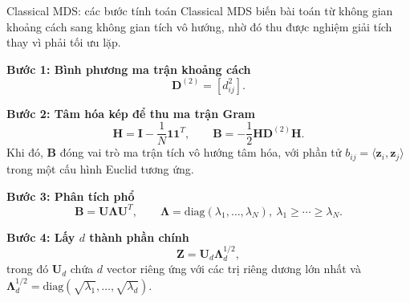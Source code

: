 \begin{frame}[shrink=4]{Classical MDS: các bước tính toán}
    \small
    Classical MDS biến bài toán từ không gian khoảng cách sang không gian tích vô hướng, nhờ đó thu được nghiệm giải tích thay vì phải tối ưu lặp.

    \vspace{0.12cm}
    {\bfseries Bước 1: Bình phương ma trận khoảng cách}
    \[
        \mathbf{D}^{(2)}=[d_{ij}^2].
    \]

    {\bfseries Bước 2: Tâm hóa kép để thu ma trận Gram}
    \[
        \mathbf{H}=\mathbf{I}-\frac{1}{N}\mathbf{1}\mathbf{1}^T,
        \qquad
        \mathbf{B}=-\frac{1}{2}\mathbf{H}\mathbf{D}^{(2)}\mathbf{H}.
    \]
    Khi đó, $\mathbf{B}$ đóng vai trò ma trận tích vô hướng tâm hóa, với phần tử $b_{ij}=\langle \mathbf{z}_i,\mathbf{z}_j\rangle$ trong một cấu hình Euclid tương ứng.

    \vspace{0.12cm}
    {\bfseries Bước 3: Phân tích phổ}
    \[
        \mathbf{B}=\mathbf{U}\mathbf{\Lambda}\mathbf{U}^T,
        \qquad
        \mathbf{\Lambda}=\mathrm{diag}(\lambda_1,\ldots,\lambda_N),\ \lambda_1\ge\cdots\ge\lambda_N.
    \]

    {\bfseries Bước 4: Lấy $d$ thành phần chính}
    \[
        \mathbf{Z}=\mathbf{U}_d\mathbf{\Lambda}_d^{1/2},
    \]
    trong đó $\mathbf{U}_d$ chứa $d$ vector riêng ứng với các trị riêng dương lớn nhất và $\mathbf{\Lambda}_d^{1/2}=\mathrm{diag}(\sqrt{\lambda_1},\ldots,\sqrt{\lambda_d})$.

    \hfill{\scriptsize \cite{duchesnay2021statsml}}
\end{frame}

